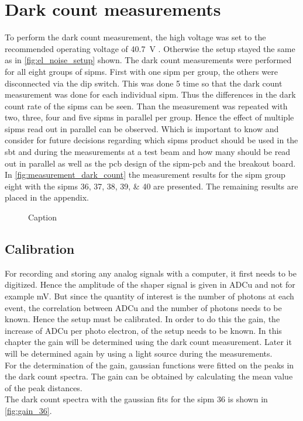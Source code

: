 \section{Dark count measurements}
To perform the dark count measurement, the high voltage was set to the recommended operating voltage of \SI{40.7}{\volt} \cite{HAMsipm_ds}. Otherwise the setup stayed the same as in \autoref{fig:el_noise_setup} shown. The dark count measurements were performed for all eight groups of \ac{sipm}s. First with one \ac{sipm} per group, the others were disconnected via the dip switch. This was done 5 time so that the dark count measurement was done for each individual \ac{sipm}. Thus the differences in the dark count rate of the \ac{sipm}s can be seen. Than the measurement was repeated with two, three, four and five \ac{sipm}s in parallel per group. Hence the effect of multiple \ac{sipm}s read out in parallel can be observed. Which is important to know and consider for future decisions regarding which \ac{sipm}s product should be used in the \ac{sbt} and during the measurements at a test beam and how many should be read out in parallel as well as the \ac{pcb} design of the \ac{sipm}-\ac{pcb} and the breakout board.\\
In \autoref{fig:measurement_dark_count} the measurement results for the \ac{sipm} group eight with the \ac{sipm}s \numlist{36;37;38;39;40} are presented. The remaining results are placed in the appendix.\\
 
\begin{figure}
    \centering
    
    \caption{Caption}
    \label{fig:measurement_dark_count}
\end{figure}

\subsection{Calibration}
For recording and storing any analog signals with a computer, it first needs to be digitized. Hence the amplitude of the shaper signal is given in ADCu and not for example \si{\milli\volt}. But since the quantity of interest is the number of photons at each event, the correlation between ADCu and the number of photons needs to be known. Hence the setup must be calibrated. 
In order to do this the gain, the increase of ADCu per photo electron,  of the setup needs to be known. In this chapter the gain will be determined using the dark count measurement. Later it will be determined again by using a light source during the measurements.\\
For the determination of the gain, gaussian functions were fitted on the peaks in the dark count spectra. The gain can be obtained by calculating the mean value of the peak distances.\\
The dark count spectra with the gaussian fits for the \ac{sipm} 36 is shown in \autoref{fig:gain_36}. 


